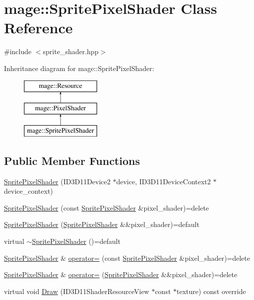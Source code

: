 \hypertarget{classmage_1_1_sprite_pixel_shader}{}\section{mage\+:\+:Sprite\+Pixel\+Shader Class Reference}
\label{classmage_1_1_sprite_pixel_shader}


{\ttfamily \#include $<$sprite\+\_\+shader.\+hpp$>$}

Inheritance diagram for mage\+:\+:Sprite\+Pixel\+Shader\+:\begin{figure}[H]
\begin{center}
\leavevmode
\includegraphics[height=3.000000cm]{classmage_1_1_sprite_pixel_shader}
\end{center}
\end{figure}
\subsection*{Public Member Functions}
\begin{DoxyCompactItemize}
\item 
\hyperlink{classmage_1_1_sprite_pixel_shader_abffbb811fa7b34e538748ae5d082aec4}{Sprite\+Pixel\+Shader} (I\+D3\+D11\+Device2 $\ast$device, I\+D3\+D11\+Device\+Context2 $\ast$device\+\_\+context)
\item 
\hyperlink{classmage_1_1_sprite_pixel_shader_a5803ea69e04c58528f9c4fbbc0f4efbc}{Sprite\+Pixel\+Shader} (const \hyperlink{classmage_1_1_sprite_pixel_shader}{Sprite\+Pixel\+Shader} \&pixel\+\_\+shader)=delete
\item 
\hyperlink{classmage_1_1_sprite_pixel_shader_a2ec1a47d5ada6e2e319605108f971d0c}{Sprite\+Pixel\+Shader} (\hyperlink{classmage_1_1_sprite_pixel_shader}{Sprite\+Pixel\+Shader} \&\&pixel\+\_\+shader)=default
\item 
virtual \hyperlink{classmage_1_1_sprite_pixel_shader_af7d6fd20a491855f8dfd2aef5e6294c4}{$\sim$\+Sprite\+Pixel\+Shader} ()=default
\item 
\hyperlink{classmage_1_1_sprite_pixel_shader}{Sprite\+Pixel\+Shader} \& \hyperlink{classmage_1_1_sprite_pixel_shader_adf6e6f0872406b9df46cb87731ed1ae0}{operator=} (const \hyperlink{classmage_1_1_sprite_pixel_shader}{Sprite\+Pixel\+Shader} \&pixel\+\_\+shader)=delete
\item 
\hyperlink{classmage_1_1_sprite_pixel_shader}{Sprite\+Pixel\+Shader} \& \hyperlink{classmage_1_1_sprite_pixel_shader_ad982c266c5ba3510009a3f5e7519e284}{operator=} (\hyperlink{classmage_1_1_sprite_pixel_shader}{Sprite\+Pixel\+Shader} \&\&pixel\+\_\+shader)=delete
\item 
virtual void \hyperlink{classmage_1_1_sprite_pixel_shader_a546d7d1b50872450577db0fff8b05151}{Draw} (I\+D3\+D11\+Shader\+Resource\+View $\ast$const $\ast$texture) const override
\end{DoxyCompactItemize}
